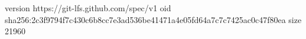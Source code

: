 version https://git-lfs.github.com/spec/v1
oid sha256:2c3f9794f7c430c6b8cc7e3ad536be41471a4e05fd64a7c7c7425ac0c47f80ea
size 21960
